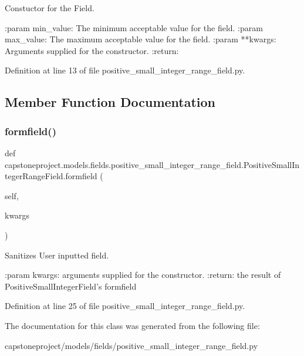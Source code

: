 \begin{DoxyVerb}Constuctor for the Field.

:param min_value: The minimum acceptable value for the field.
:param max_value: The maximum acceptable value for the field.
:param **kwargs: Arguments supplied for the constructor.
:return:
\end{DoxyVerb}
 

Definition at line 13 of file positive\+\_\+small\+\_\+integer\+\_\+range\+\_\+field.\+py.



\subsection{Member Function Documentation}
\mbox{\label{classcapstoneproject_1_1models_1_1fields_1_1positive__small__integer__range__field_1_1_positive_small_integer_range_field_ae2db3d515bb797aecdb17a4524b8fc8b}} 
\subsubsection{\texorpdfstring{formfield()}{formfield()}}
{\footnotesize\ttfamily def capstoneproject.\+models.\+fields.\+positive\+\_\+small\+\_\+integer\+\_\+range\+\_\+field.\+Positive\+Small\+Integer\+Range\+Field.\+formfield (\begin{DoxyParamCaption}\item[{}]{self,  }\item[{}]{kwargs }\end{DoxyParamCaption})}

\begin{DoxyVerb}Sanitizes User inputted field.

:param kwargs: arguments supplied for the constructor.
:return: the result of PositiveSmallIntegerField's formfield
\end{DoxyVerb}
 

Definition at line 25 of file positive\+\_\+small\+\_\+integer\+\_\+range\+\_\+field.\+py.



The documentation for this class was generated from the following file\+:\begin{DoxyCompactItemize}
\item 
capstoneproject/models/fields/positive\+\_\+small\+\_\+integer\+\_\+range\+\_\+field.\+py\end{DoxyCompactItemize}
